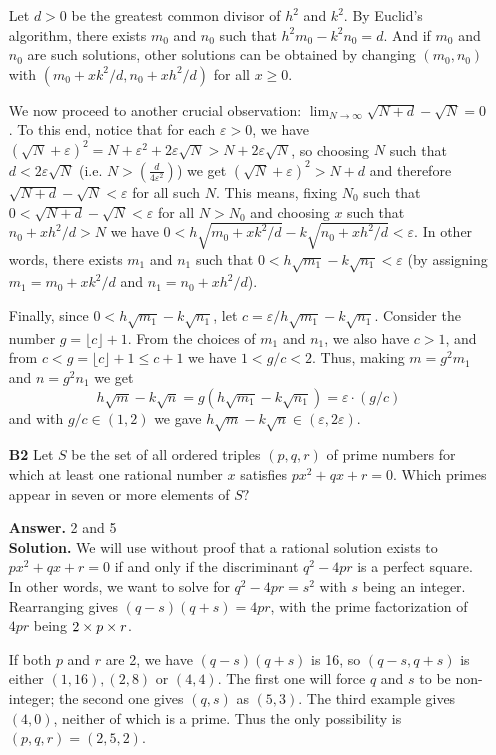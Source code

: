 \documentclass[11pt,a4paper]{article}
\newcommand{\<}{\langle}
\renewcommand{\>}{\rangle}
\begin{document}
\begin{enumerate}
	Let $d > 0$ be the greatest common divisor of $h^2$ and $k^2$. By Euclid's algorithm, there exists $m_0$ and $n_0$ such that $h^2m_0-k^2n_0=d$. And if $m_0$ and $n_0$ are such solutions, other solutions can be obtained by changing $(m_0, n_0)$ with $(m_0+xk^2/d, n_0+xh^2/d)$ for all $x\ge 0$. 
	
	We now proceed to another crucial observation: $\lim_{N\to \infty}\sqrt{N+d}-\sqrt{N}=0$. To this end, notice that for each $\varepsilon>0$, we have $(\sqrt{N}+\varepsilon)^2=N+\varepsilon^2 + 2\varepsilon\sqrt{N}>N+2\varepsilon\sqrt{N}$, so choosing $N$ such that $d<2\varepsilon\sqrt{N}$ (i.e. $N>(\frac{d}{4\varepsilon^2})$) we get $(\sqrt{N}+\varepsilon)^2 > N+d$ and therefore $\sqrt{N+d}-\sqrt{N}<\varepsilon$ for all such $N$. 
	This means, fixing $N_0$ such that $0<\sqrt{N+d}-\sqrt{N}<\varepsilon$ for all $N>N_0$ and choosing $x$ such that $n_0+xh^2/d>N$ we have $0<h\sqrt{m_0+xk^2/d} - k\sqrt{n_0+xh^2/d} < \varepsilon$. In other words, there exists $m_1$ and $n_1$ such that $0<h\sqrt{m_1} - k\sqrt{n_1}<\varepsilon$ (by assigning $m_1 = m_0+xk^2/d$ and $n_1 = n_0+xh^2/d$). 
	
	Finally, since $0 < h\sqrt{m_1} - k\sqrt{n_1}$, let $c = \varepsilon / h\sqrt{m_1} - k\sqrt{n_1}$. Consider the number $g = \lfloor c\rfloor + 1$. From the choices of $m_1$ and $n_1$, we also have $c>1$, and from $ c < g = \lfloor c\rfloor + 1\le c+1$ we have $1 < g/c < 2$. 
	Thus, making $m=g^2m_1$ and $n=g^2n_1$ we get 
	\[
	h\sqrt{m} - k\sqrt{n} = g(h\sqrt{m_1} - k\sqrt{n_1}) = \varepsilon\cdot (g/c)
	\]
	and with $g/c\in (1, 2)$ we gave $h\sqrt{m} - k\sqrt{n}\in (\varepsilon, 2\varepsilon)$. 
	
	\item[\textbf{B2}] Let $S$ be the set of all ordered triples $(p,q,r)$ of prime numbers for which at least one rational number $x$ satisfies $px^2+qx+r=0.$ Which primes appear in seven or more elements of $S?$
	
	\textbf{Answer.} 2 and 5\\
	\textbf{Solution.} We will use without proof that a rational solution exists to $px^2+qx+r=0$ if and only if the discriminant $q^2-4pr$ is a perfect square. In other words, we want to solve for $q^2-4pr=s^2$ with $s$ being an integer. Rearranging gives $(q-s)(q+s)=4pr$, with the prime factorization of $4pr$ being $2\time 2\times p\times r$. 
	
	If both $p$ and $r$ are 2, we have $(q-s)(q+s)$ is 16, so $(q-s, q+s)$ is either $(1, 16), (2, 8)$ or $(4, 4)$. The first one will force $q$ and $s$ to be non-integer; the second one gives $(q, s)$ as $(5, 3)$. The third example gives $(4, 0)$, neither of which is a prime. Thus the only possibility is $(p, q, r)=(2, 5, 2)$. 
	

\end{enumerate}
\end{document}
